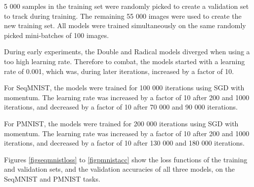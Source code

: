 \documentclass[a4paper, twoside]{article}
\begin{document}
5 000 samples in the training set were randomly picked to create a validation set to track during training. The remaining 55 000 images were used to create the new training set. All models were trained simultaneously on the same randomly picked mini-batches of 100 images.

During early experiments, the Double and Radical models diverged when using a too high learning rate. Therefore to combat, the models started with a learning rate of 0.001, which was, during later iterations, increased by a factor of 10.

For SeqMNIST, the models were trained for 100 000 iterations using SGD with momentum. The learning rate was increased by a factor of 10 after 200 and 1000 iterations, and decreased by a factor of 10 after 70 000 and 90 000 iterations.

For PMNIST, the models were trained for 200 000 iterations using SGD with momentum. The learning rate was increased by a factor of 10 after 200 and 1000 iterations, and decreased by a factor of 10 after 130 000 and 180 000 iterations.

Figures \ref{figseqmnistloss} to \ref{figpmnistacc} show the loss functions of the training and validation sets, and the validation accuracies of all three models, on the SeqMNIST and PMNIST tasks.
\end{document}

